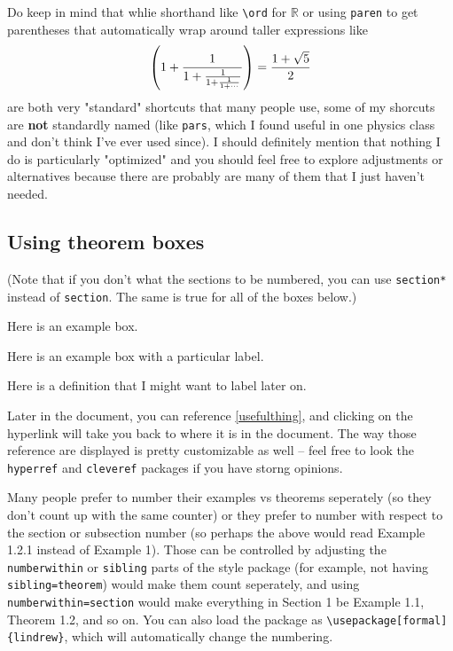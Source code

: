\documentclass[11pt]{article}
\begin{document}
\begin{remark*}
    Do keep in mind that whlie shorthand like \texttt{\textbackslash ord} for $\mathbb{R}$ or using \texttt{\texttt{paren}} to get parentheses that automatically wrap around taller expressions like
    \[
        \left(1 + \frac{1}{1 + \frac{1}{ 1 + \frac{1}{1 + \cdots}}}\right) = \frac{1 +
            \sqrt{5}}{2}
    \]
    are both very "standard" shortcuts that many people use, some of my shorcuts
    are \textbf{not} standardly named (like \texttt{pars}, which I found useful in
    one physics class and don't think I've ever used since). I should definitely
    mention that nothing I do is particularly "optimized" and you should feel free
    to explore adjustments or alternatives because there are probably are many of
    them that I just haven't needed.
\end{remark*}
\subsection{Using theorem boxes}
(Note that if you don't what the sections to be numbered, you can use \texttt{section*} instead of \texttt{section}. The same is true for all of the boxes below.)
\begin{example}
    Here is an example box.
\end{example}

\begin{theorem}
    Here is an example  box with a particular label.
\end{theorem}

\begin{definition}\label{usefulthing}
    Here is a definition that I might want to label later on.
\end{definition}

Later in the document, you can reference \cref{usefulthing}, and clicking on
the hyperlink will take you back to where it is in the document. The way those
reference are displayed is pretty customizable as well -- feel free to look the
\texttt{hyperref} and \texttt{cleveref} packages if you have storng opinions.

Many people prefer to number their examples vs theorems seperately (so they
don't count up with the same counter) or they prefer to number with respect to
the section or subsection number (so perhaps the above would read Example 1.2.1
instead of Example 1). Those can be controlled by adjusting the
\texttt{numberwithin} or \texttt{sibling} parts of the style package (for
example, not having \texttt{sibling=theorem}) would make them count seperately,
and using \texttt{numberwithin=section} would make everything in Section 1 be
Example 1.1, Theorem 1.2, and so on. You can also load the package as
\texttt{\textbackslash usepackage[formal]\{lindrew\}}, which will automatically
change the numbering.
\end{document}
